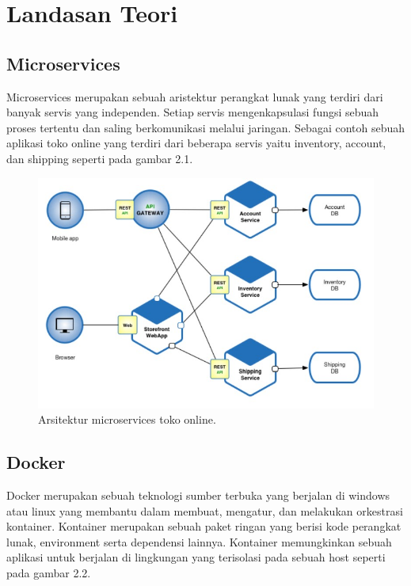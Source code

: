 \section{Landasan Teori}
  \subsection{Microservices}
  Microservices merupakan sebuah aristektur perangkat lunak yang terdiri dari banyak servis yang independen. Setiap servis mengenkapsulasi fungsi sebuah proses tertentu dan saling berkomunikasi melalui jaringan\cite{BuildingMicroservices}. Sebagai contoh sebuah aplikasi toko online yang terdiri dari beberapa servis yaitu inventory, account, dan shipping seperti pada gambar 2.1. 
  
  \begin{figure}[H]
    \centering
      \includegraphics[scale=0.8]{gambar/microservices_architecture}
      \caption{Arsitektur microservices toko online.}
      \label{microservices}
  \end{figure}

  \subsection{Docker}
  Docker merupakan sebuah teknologi sumber terbuka yang berjalan di windows atau linux yang membantu dalam membuat, mengatur, dan melakukan orkestrasi kontainer. Kontainer merupakan sebuah paket ringan yang berisi kode perangkat lunak, environment serta dependensi lainnya. Kontainer memungkinkan sebuah aplikasi untuk berjalan di lingkungan yang terisolasi pada sebuah host seperti pada gambar 2.2.

